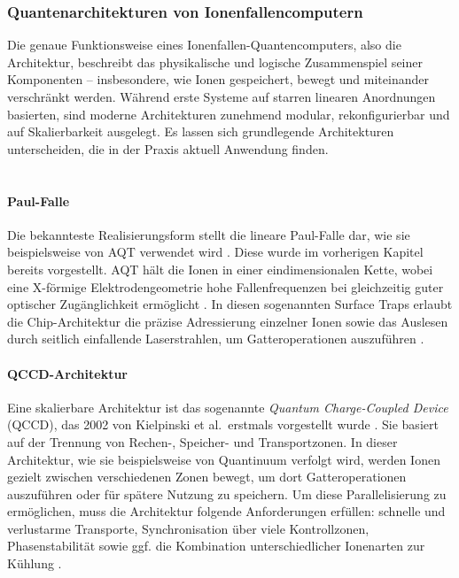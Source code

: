 \subsubsection{Quantenarchitekturen von Ionenfallencomputern}
Die genaue Funktionsweise eines Ionenfallen-Quantencomputers, also die Architektur, beschreibt das physikalische und logische Zusammenspiel seiner Komponenten – insbesondere, wie Ionen gespeichert, bewegt und miteinander verschränkt werden. Während erste Systeme auf starren linearen Anordnungen basierten, sind moderne Architekturen zunehmend modular, rekonfigurierbar und auf Skalierbarkeit ausgelegt. Es lassen sich grundlegende Architekturen unterscheiden, die in der Praxis aktuell Anwendung finden.
\\\\
\paragraph{Paul-Falle}

Die bekannteste Realisierungsform stellt die lineare Paul-Falle dar, wie sie beispielsweise von AQT verwendet wird \cite{bischoff2024}. Diese wurde im vorherigen Kapitel bereits vorgestellt. AQT hält die Ionen in einer eindimensionalen Kette, wobei eine X-förmige Elektrodengeometrie hohe Fallenfrequenzen bei gleichzeitig guter optischer Zugänglichkeit ermöglicht \cite{frisch2024, strohm2024}. In diesen sogenannten Surface Traps erlaubt die Chip-Architektur die präzise Adressierung einzelner Ionen sowie das Auslesen durch seitlich einfallende Laserstrahlen, um Gatteroperationen auszuführen \cite{strohm2024}.

\medskip

\paragraph{QCCD-Architektur}

Eine skalierbare Architektur ist das sogenannte \textit{Quantum Charge-Coupled Device} (QCCD), das 2002 von Kielpinski et al.\ erstmals vorgestellt wurde \cite{kielpinski2002}. Sie basiert auf der Trennung von Rechen-, Speicher- und Transportzonen. In dieser Architektur, wie sie beispielsweise von Quantinuum verfolgt wird, werden Ionen gezielt zwischen verschiedenen Zonen bewegt, um dort Gatteroperationen auszuführen oder für spätere Nutzung zu speichern. Um diese Parallelisierung zu ermöglichen, muss die Architektur folgende Anforderungen erfüllen: schnelle und verlustarme Transporte, Synchronisation über viele Kontrollzonen, Phasenstabilität sowie ggf. die Kombination unterschiedlicher Ionenarten zur Kühlung \cite{strohm2024}.

